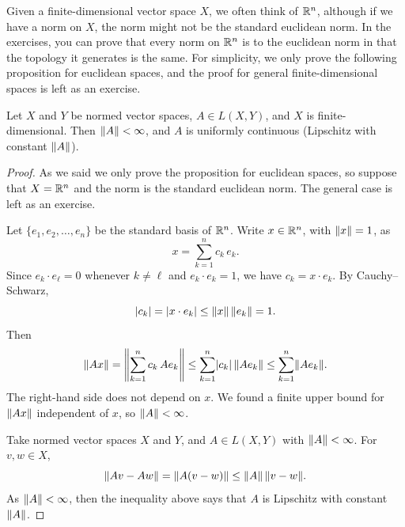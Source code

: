 Given a finite-dimensional vector space $X$, we often think of
${\mathbb{R}}^n$, although if we have a norm on $X$, the norm might not be
the standard euclidean norm.  In the exercises, you can prove that
every norm on ${\mathbb{R}}^n$ is  to the euclidean norm in that the
topology it generates is the same.  For simplicity, we only prove the
following proposition for euclidean spaces, and the proof for general
finite-dimensional spaces is left as an exercise.

\begin{prop} \label{prop:finitedimpropnormfin}
Let $X$ and $Y$ be normed vector spaces, $A \in L(X,Y)$, and
$X$ is finite-dimensional.
Then $\lVert {A} \rVert < \infty$, and
$A$ is uniformly continuous (Lipschitz with constant $\lVert {A} \rVert$).
\end{prop}

\begin{proof}
As we said we only prove the proposition for euclidean spaces, so suppose
that $X = {\mathbb{R}}^n$ and the norm is the standard euclidean norm.
The general case is left as an exercise.

Let $\{ e_1,e_2,\ldots,e_n \}$ be the standard basis of ${\mathbb{R}}^n$.
Write $x \in {\mathbb{R}}^n$, with $\lVert {x} \rVert = 1$, as
\begin{equation*}
x = \sum_{k=1}^n c_k \, e_k .
\end{equation*}
Since $e_k \cdot e_\ell = 0$ whenever $k\not=\ell$ and $e_k \cdot e_k = 1$,
we have $c_k = x \cdot e_k$.  By Cauchy--Schwarz,
\begin{equation*}
\lvert {c_k} \rvert = \lvert { x \cdot e_k } \rvert
\leq \lVert {x} \rVert \, \lVert {e_k} \rVert = 1 .
\end{equation*}
Then
\begin{equation*}
\lVert {Ax} \rVert =
\left\lVert {\sum_{k=1}^n c_k \, Ae_k} \right\rVert
\leq
\sum_{k=1}^n \lvert {c_k} \rvert \, \lVert {Ae_k} \rVert 
\leq
\sum_{k=1}^n \lVert {Ae_k} \rVert .
\end{equation*}
The right-hand side does not depend on $x$.  We found
a finite upper bound for $\lVert {Ax} \rVert$ independent of $x$, so $\lVert {A} \rVert < \infty$.

Take normed vector spaces $X$ and $Y$, and $A \in L(X,Y)$ with
$\lVert {A} \rVert < \infty$.
For $v,w \in X$,
\begin{equation*}
\lVert {Av - Aw} \rVert =
\lVert {A(v-w)} \rVert \leq \lVert {A} \rVert \, \lVert {v-w} \rVert .
\end{equation*}
As $\lVert {A} \rVert < \infty$, then the inequality above says that
$A$ is Lipschitz with constant $\lVert {A} \rVert$.
\end{proof}

